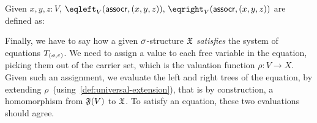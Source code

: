 \begin{example}
    Given $x, y, z : V$, $\eqleft_{V}(\term{assocr}, (x,y,z)),\,\eqright_{V}(\term{assocr}, (x,y,z))$
    are defined as:
    \begin{center}
    \end{center}
\end{example}
Finally, we have to say how a given $\sigma$-structure $\mathfrak{X}$
\emph{satisfies} the system of equations $T_{(\sigma,\varepsilon)}$.
%
We need to assign a value to each free variable in the equation,
picking them out of the carrier set, which is the valuation function $\rho : V \to X$.
%
Given such an assignment, we evaluate the left and right trees of the equation,
by extending $\rho\,$ (using~\cref{def:universal-extension}),
that is by construction, a homomorphism from $\mathfrak{F}(V)$ to $\mathfrak{X}$.
%
To satisfy an equation, these two evaluations should agree.
%
